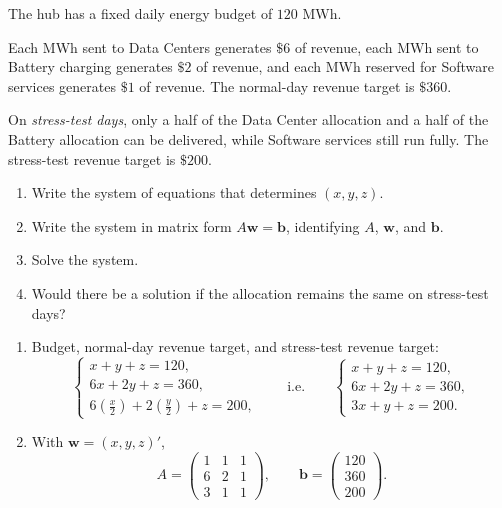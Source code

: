 \documentclass[11pt]{exam}
\begin{document}
\begin{questions}
The hub has a fixed daily energy budget of \(120\) MWh.

Each MWh sent to Data Centers generates \(\$6\) of revenue, each MWh sent to Battery charging generates \(\$2\) of revenue, and each MWh reserved for Software services generates \(\$1\) of revenue. The normal-day revenue target is \(\$360\).

On \emph{stress-test days}, only a half of the Data Center allocation and a half of the Battery allocation can be delivered, while Software services still run fully. The stress-test revenue target is \(\$200\).

\begin{enumerate}[leftmargin=0.5cm,label=(\alph*)]
  \item Write the system of equations that determines \((x,y,z)\).
  \item Write the system in matrix form \(A\mathbf w=\mathbf b\), identifying \(A\), \(\mathbf w\), and \(\mathbf b\).
  \item Solve the system.
  \item Would there be a solution if the allocation remains the same on stress-test days?
\end{enumerate}

\begin{solution}[0cm]
\begin{enumerate}[leftmargin=0.5cm,label=(\alph*)]

\item Budget, normal-day revenue target, and stress-test revenue target:
\[
\begin{cases}
x+y+z=120,\\
6x+2y+z=360,\\
6\left(\frac{x}{2}\right)+2\left(\frac{y}{2}\right)+z=200,
\end{cases}
\qquad\text{i.e.}\qquad
\begin{cases}
x+y+z=120,\\
6x+2y+z=360,\\
3x+y+z=200.
\end{cases}
\]

\item With \(\mathbf w=(x,y,z)'\),
\[
A=
\begin{pmatrix}
1&1&1\\
6&2&1\\
3&1&1
\end{pmatrix},
\qquad
\mathbf b=
\begin{pmatrix}
120\\360\\200
\end{pmatrix}.
\]


\end{enumerate}
\end{solution}
\end{questions}
\end{document}
